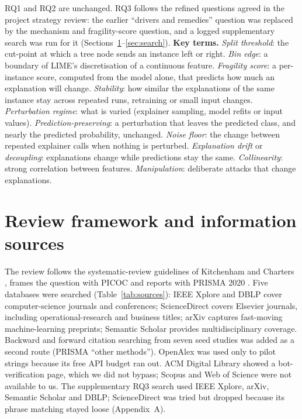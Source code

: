 \vspace{-4pt}
{\small RQ1 and RQ2 are unchanged. RQ3 follows the refined questions agreed in the project strategy review: the earlier ``drivers and remedies'' question was replaced by the mechanism and fragility-score question, and a logged supplementary search was run for it (Sections~\ref{sec:sources}--\ref{sec:search}).
\textbf{Key terms.} \textit{Split threshold}: the cut-point at which a tree node sends an instance left or right. \textit{Bin edge}: a boundary of LIME's discretisation of a continuous feature. \textit{Fragility score}: a per-instance score, computed from the model alone, that predicts how much an explanation will change. \textit{Stability}: how similar the explanations of the same instance stay across repeated runs, retraining or small input changes. \textit{Perturbation regime}: what is varied (explainer sampling, model refits or input values). \textit{Prediction-preserving}: a perturbation that leaves the predicted class, and nearly the predicted probability, unchanged. \textit{Noise floor}: the change between repeated explainer calls when nothing is perturbed. \textit{Explanation drift} or \textit{decoupling}: explanations change while predictions stay the same. \textit{Collinearity}: strong correlation between features. \textit{Manipulation}: deliberate attacks that change explanations.}

\section{Review framework and information sources}\label{sec:sources}
The review follows the systematic-review guidelines of Kitchenham and Charters \cite{kitchenham2007}, frames the question with PICOC \cite{petticrew2006} and reports with PRISMA 2020 \cite{page2021}. Five databases were searched (Table~\ref{tab:sources}): IEEE Xplore and DBLP cover computer-science journals and conferences; ScienceDirect covers Elsevier journals, including operational-research and business titles; arXiv captures fast-moving machine-learning preprints; Semantic Scholar provides multidisciplinary coverage. Backward and forward citation searching from seven seed studies was added as a second route (PRISMA ``other methods''). OpenAlex was used only to pilot strings because its free API budget ran out. ACM Digital Library showed a bot-verification page, which we did not bypass; Scopus and Web of Science were not available to us. The supplementary RQ3 search used IEEE Xplore, arXiv, Semantic Scholar and DBLP; ScienceDirect was tried but dropped because its phrase matching stayed loose (Appendix~A).

